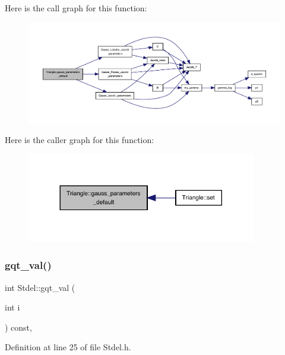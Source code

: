 Here is the call graph for this function\+:
\nopagebreak
\begin{figure}[H]
\begin{center}
\leavevmode
\includegraphics[width=350pt]{classTriangle_a37e1fe2af0b509986126c978e9dbbe76_cgraph}
\end{center}
\end{figure}
Here is the caller graph for this function\+:
\nopagebreak
\begin{figure}[H]
\begin{center}
\leavevmode
\includegraphics[width=284pt]{classTriangle_a37e1fe2af0b509986126c978e9dbbe76_icgraph}
\end{center}
\end{figure}
\mbox{\label{classStdel_a0775d0c4f7f15ae26bd45fc949e6f6b9}} 
\subsubsection{\texorpdfstring{gqt\+\_\+val()}{gqt\_val()}}
{\footnotesize\ttfamily int Stdel\+::gqt\+\_\+val (\begin{DoxyParamCaption}\item[{int}]{i }\end{DoxyParamCaption}) const\hspace{0.3cm}{\ttfamily [inline]}, {\ttfamily [inherited]}}



Definition at line 25 of file Stdel.\+h.



